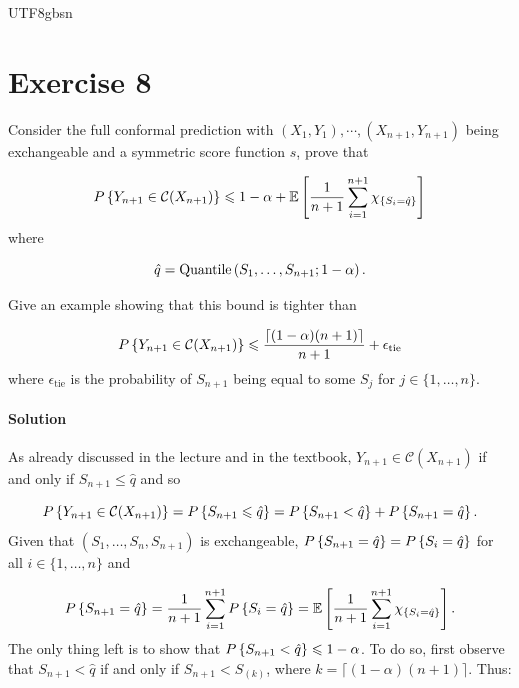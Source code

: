 \documentclass[../main.tex]{subfiles}
\begin{document}
\begin{CJK*}{UTF8}{gbsn}

\section*{Exercise 8}
Consider the full conformal prediction 
with $(X_1, Y_1), \cdots, (X_{n+1}, Y_{n+1})$ 
being exchangeable and a symmetric score function $s$,
prove that 

\begin{equation*}
    P \left \{ Y_{n+1} \in \mathcal{C}(X_{n+1}) \right \} \leqslant 1 - \alpha + 
    \mathbb{E} \left [ \frac{1}{n+1}\sum_{i=1}^{n+1} \chi_{\{S_i = \hat{q}\}} \right ]
\end{equation*}
where 

\begin{equation*}
    \hat{q} = \text{Quantile}\left ( S_1, \ldots, S_{n+1}; 1- \alpha \right ).
\end{equation*}

Give an example showing that this bound is tighter than 

\begin{equation*}
    P \left \{ Y_{n+1} \in \mathcal{C}(X_{n+1}) \right \} \leqslant \frac{\lceil (1-\alpha)(n+1) \rceil}{n+1}
    + \epsilon_{\text{tie}}
\end{equation*}
where $\epsilon_{\text{tie}}$
is the probability of $S_{n+1}$ 
being equal to some $S_j$ for $j \in \{1, \ldots, n\}$.

\paragraph{Solution}
As already discussed in the lecture and in the textbook,
$Y_{n+1} \in \mathcal{C}(X_{n+1})$ if and only if $S_{n+1} \leqslant \hat{q}$
and so 

\begin{equation*}
    P \left \{ Y_{n+1} \in \mathcal{C}(X_{n+1}) \right \} =
    P \left \{ S_{n+1} \leqslant \hat{q} \right \} =
    P \left \{ S_{n+1} < \hat{q} \right \} + P \left \{ S_{n+1} = \hat{q} \right \}.
\end{equation*}
Given that $(S_1, \ldots, S_n,S_{n+1})$ is exchangeable,
$P \left \{ S_{n+1} = \hat{q} \right \} = P \left \{ S_{i} = \hat{q} \right \}$
for all $i \in \{1, \ldots, n\}$ and

\begin{equation*}
    P \left \{ S_{n+1} = \hat{q} \right \} 
    = \frac{1}{n+1} \sum_{i=1}^{n+1} P \left \{ S_{i} = \hat{q} \right \}
    = \mathbb{E} \left [ \frac{1}{n+1}\sum_{i=1}^{n+1} \chi_{\{S_i = \hat{q}\}} \right ].
\end{equation*}
The only thing left is to show that $P \left \{ S_{n+1} < \hat{q} \right \} \leqslant 1-\alpha$.
To do so, first observe that 
$S_{n+1} < \hat{q}$ if and only if $S_{n+1} < S_{(k)}$,
where $k = \lceil (1-\alpha)(n+1) \rceil$.
Thus:


\end{CJK*}
\end{document}
